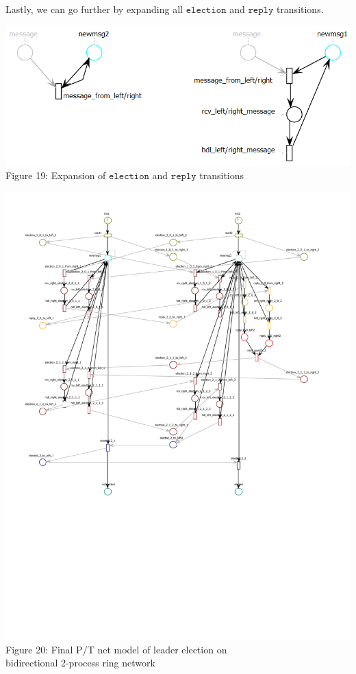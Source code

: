 \documentclass{article}
\begin{document}
	\subparagraph{}Lastly, we can go further by expanding all $\mathtt{election}$ and $\mathtt{reply}$ transitions.
	\begin{center}
		\includegraphics[scale=0.5]{ring_expanded}
		\\Figure 19: Expansion of $\mathtt{election}$ and $\mathtt{reply}$ transitions
	\end{center}
	\begin{center}
		\hspace*{-120pt}
		\includegraphics[scale=1,trim=0 250 0 35,clip]{ring2}
		\\Figure 20: Final P/T net model of leader election on\\ bidirectional 2-process ring network
	\end{center}
\end{document}

